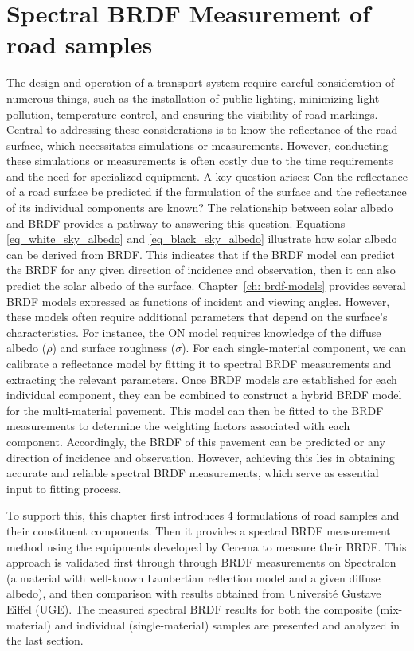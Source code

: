 \chapter{Spectral BRDF Measurement of road samples}



The design and operation of a transport system require careful consideration of numerous things, such as the installation of public lighting, minimizing light pollution, temperature control, and ensuring the visibility of road markings.
Central to addressing these considerations is to know the reflectance of the road surface, which necessitates simulations or measurements.
However, conducting these simulations or measurements is often costly due to the time requirements and the need for specialized equipment.
A key question arises: Can the reflectance of a road surface be predicted if the formulation of the surface and the reflectance of its individual components are known?
The relationship between solar albedo and BRDF provides a pathway to answering this question.
Equations \eqref{eq_white_sky_albedo} and \eqref{eq_black_sky_albedo} illustrate how solar albedo can be derived from BRDF.
This indicates that if the BRDF model can predict the BRDF for any given direction of incidence and observation, then it can also predict the solar albedo of the surface.
Chapter~\ref{ch: brdf-models} provides several BRDF models expressed as functions of incident and viewing angles.
However, these models often require additional parameters that depend on the surface's characteristics.
For instance, the ON model requires knowledge of the diffuse albedo ($\rho$) and surface roughness ($\sigma$).
For each single-material component, we can calibrate a reflectance model by fitting it to spectral BRDF measurements and extracting the relevant parameters.
Once BRDF models are established for each individual component, they can be combined to construct a hybrid BRDF model for the multi-material pavement.
This model can then be fitted to the BRDF measurements to determine the weighting factors associated with each component.
Accordingly, the BRDF of this pavement can be predicted or any direction of incidence and observation.
However, achieving this lies in obtaining accurate and reliable spectral BRDF measurements, which serve as essential input to fitting process.

To support this, this chapter first introduces 4 formulations of road samples and their constituent components.
Then it provides a spectral BRDF measurement method using the equipments developed by Cerema to measure their BRDF.
This approach is validated first through through BRDF measurements on Spectralon (a material with well-known Lambertian reflection model and a given diffuse albedo), and then comparison with results obtained from Université Gustave Eiffel (UGE).
The measured spectral BRDF results for both the composite (mix-material) and individual (single-material) samples are presented and analyzed in the last section.


